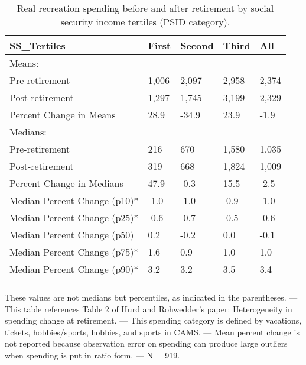 \begin{table}[tbp] \centering
{}

\caption{Real recreation spending before and after retirement by social security income tertiles (PSID category).}
\begin{tabularx}{\textwidth}{lCCCC}

\toprule
{SS\_Tertiles}&{First}&{Second}&{Third}&{All} \tabularnewline
\midrule\addlinespace[1.5ex]
Means:&&&& \tabularnewline
\midrule Pre-retirement&1,006&2,097&2,958&2,374 \tabularnewline
Post-retirement&1,297&1,745&3,199&2,329 \tabularnewline
Percent Change in Means&28.9&-34.9&23.9&-1.9 \tabularnewline
\midrule Medians:&&&& \tabularnewline
\midrule Pre-retirement&216&670&1,580&1,035 \tabularnewline
Post-retirement&319&668&1,824&1,009 \tabularnewline
Percent Change in Medians&47.9&-0.3&15.5&-2.5 \tabularnewline
Median Percent Change (p10)*&-1.0&-1.0&-0.9&-1.0 \tabularnewline
Median Percent Change (p25)*&-0.6&-0.7&-0.5&-0.6 \tabularnewline
Median Percent Change (p50)&0.2&-0.2&0.0&-0.1 \tabularnewline
Median Percent Change (p75)*&1.6&0.9&1.0&1.0 \tabularnewline
Median Percent Change (p90)*&3.2&3.2&3.5&3.4 \tabularnewline
\bottomrule \addlinespace[1.5ex]

\end{tabularx}
\begin{flushleft}
\footnotesize *These values are not medians but percentiles, as indicated in the parentheses. \linebreak --- \linebreak This table references Table 2 of Hurd and Rohwedder's paper: Heterogeneity in spending change at retirement. \linebreak --- \linebreak This spending category is defined by vacations, tickets, hobbies/sports, hobbies, and sports in CAMS. \linebreak --- \linebreak Mean percent change is not reported because observation error on spending can produce large outliers when spending is put in ratio form. \linebreak --- \linebreak N = 919.
\end{flushleft}
\end{table}
